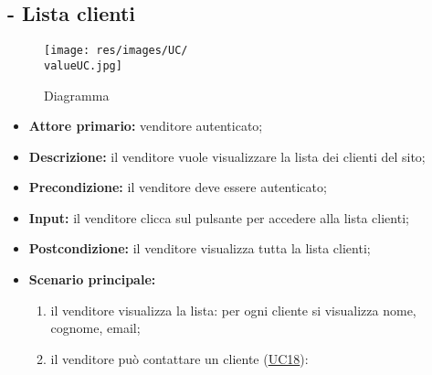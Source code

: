 \stepUserCase
\subsection{ - Lista clienti}
\begin{figure}[H]
    \centering
    \texttt{[image: res/images/UC/\\valueUC.jpg]}
    \caption{Diagramma }
\end{figure}
\begin{itemize}
    \item \textbf{Attore primario:} venditore autenticato;
    \item \textbf{Descrizione:} il venditore vuole visualizzare la lista dei clienti del sito;
    \item \textbf{Precondizione:} il venditore deve essere autenticato;
    \item \textbf{Input:} il venditore clicca sul pulsante per accedere alla lista clienti;
    \item \textbf{Postcondizione:} il venditore visualizza tutta la lista clienti;
    \item \textbf{Scenario principale:}
          \begin{enumerate}
              \item il venditore visualizza la lista: per ogni cliente si visualizza nome, cognome, email;
              \item il venditore può contattare un cliente (\hyperref[UC18]{UC18}):
          \end{enumerate}
\end{itemize}

\stepUserCase
